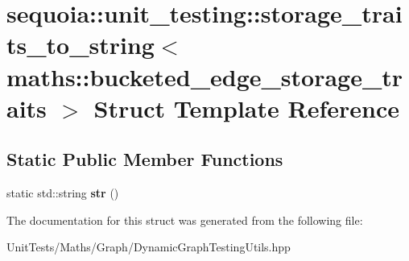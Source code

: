 \hypertarget{structsequoia_1_1unit__testing_1_1storage__traits__to__string_3_01maths_1_1bucketed__edge__storage__traits_01_4}{}\section{sequoia\+::unit\+\_\+testing\+::storage\+\_\+traits\+\_\+to\+\_\+string$<$ maths\+::bucketed\+\_\+edge\+\_\+storage\+\_\+traits $>$ Struct Template Reference}
\label{structsequoia_1_1unit__testing_1_1storage__traits__to__string_3_01maths_1_1bucketed__edge__storage__traits_01_4}
\subsection*{Static Public Member Functions}
\begin{DoxyCompactItemize}
\item 
\mbox{\label{structsequoia_1_1unit__testing_1_1storage__traits__to__string_3_01maths_1_1bucketed__edge__storage__traits_01_4_a087bbc882e081aa355ac0c6c907cd921}} 
static std\+::string {\bfseries str} ()
\end{DoxyCompactItemize}


The documentation for this struct was generated from the following file\+:\begin{DoxyCompactItemize}
\item 
Unit\+Tests/\+Maths/\+Graph/Dynamic\+Graph\+Testing\+Utils.\+hpp\end{DoxyCompactItemize}
